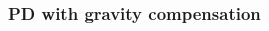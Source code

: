 %
\begin{frame}
\frametitle{PD with gravity compensation}
%
\begin{columns}
	\begin{column}{0.5\textwidth}
	\begin{figure}
	\end{figure}
	\end{column}
	\begin{column}{0.5\textwidth}
	\begin{figure}
	\end{figure}
	\end{column}
\end{columns}
\end{frame}
%
